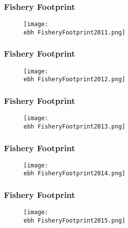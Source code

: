 \documentclass{beamer}
\newcommand{\ebh}{\string~/bio.data/bio.lobster/figures/Assessment/LFA2732/} %
\begin{document}
\begin{frame}
\frametitle{Fishery Footprint}
\begin{figure}
        \begin{center}
            \texttt{[image: \\ebh FisheryFootprint2011.png]}
        \end{center}
    \end{figure}
\end{frame}




\begin{frame}
\frametitle{Fishery Footprint}
\begin{figure}
        \begin{center}
            \texttt{[image: \\ebh FisheryFootprint2012.png]}
        \end{center}
    \end{figure}
\end{frame}




\begin{frame}
\frametitle{Fishery Footprint}
\begin{figure}
        \begin{center}
            \texttt{[image: \\ebh FisheryFootprint2013.png]}
        \end{center}
    \end{figure}
\end{frame}




\begin{frame}
\frametitle{Fishery Footprint}
\begin{figure}
        \begin{center}
            \texttt{[image: \\ebh FisheryFootprint2014.png]}
        \end{center}
    \end{figure}
\end{frame}




\begin{frame}
\frametitle{Fishery Footprint}
\begin{figure}
        \begin{center}
            \texttt{[image: \\ebh FisheryFootprint2015.png]}
        \end{center}
    \end{figure}
\end{frame}
\end{document}
